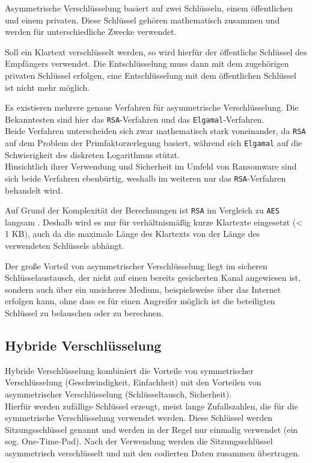 Asymmetrische Verschlüsselung basiert auf zwei Schlüsseln, einem öffentlichen und einem privaten. Diese Schlüssel gehören mathematisch zusammen und werden für unterschiedliche Zwecke verwendet.

Soll ein Klartext verschlüsselt werden, so wird hierfür der öffentliche Schlüssel des Empfängers verwendet. Die Entschlüsselung muss dann mit dem zugehörigen privaten Schlüssel erfolgen, eine Entschlüsselung mit dem öffentlichen Schlüssel ist nicht mehr möglich.

Es existieren mehrere genaue Verfahren für asymmetrische Verschlüsselung. Die Bekanntesten sind hier das \texttt{RSA}-Verfahren und das \texttt{Elgamal}-Verfahren.\\
Beide Verfahren unterscheiden sich zwar mathematisch stark voneinander, da \texttt{RSA} auf dem Problem der Primfaktorzerlegung basiert, während sich \texttt{Elgamal} auf die Schwierigkeit des diskreten Logarithmus stützt. \\
Hinsichtlich ihrer Verwendung und Sicherheit im Umfeld von Ransomware sind sich beide Verfahren ebenbürtig, weshalb im weiteren nur das \texttt{RSA}-Verfahren behandelt wird.

Auf Grund der Komplexität der Berechnungen ist \texttt{RSA} im Vergleich zu \texttt{AES} langsam \cite{crypto:aes_rsa_benchmark}. Deshalb wird es nur für verhältnismäßig kurze Klartexte eingesetzt (< 1 KB), auch da die maximale Länge des Klartexts von der Länge des verwendeten Schlüssels abhängt. \cite{rsa}

Der große Vorteil von asymmetrischer Verschlüsselung liegt im sicheren Schlüsselaustausch, der nicht auf einen bereits gesicherten Kanal angewiesen ist, sondern auch über ein unsicheres Medium, beispielsweise über das Internet erfolgen kann, ohne dass es für einen Angreifer möglich ist die beteiligten Schlüssel zu belauschen oder zu berechnen.

\subsection{Hybride Verschlüsselung}
\label{sec:hybride_verschl}

Hybride Verschlüsselung kombiniert die Vorteile von symmetrischer Verschlüsselung (Geschwindigkeit, Einfachheit) mit den Vorteilen von asymmetrischer Verschlüsselung (Schlüsseltausch, Sicherheit). \\
Hierfür werden zufällige Schlüssel erzeugt, meist lange Zufallszahlen, die für die symmetrische Verschlüsselung verwendet werden. Diese Schlüssel werden Sitzungsschlüssel genannt und werden in der Regel nur einmalig verwendet (ein sog. One-Time-Pad). Nach der Verwendung werden die Sitzungsschlüssel asymmetrisch verschlüsselt und mit den codierten Daten zusammen übertragen.


